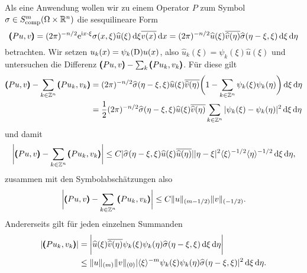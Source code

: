 Als eine Anwendung wollen wir zu einem Operator $P$ zum Symbol $\sigma\in S^m_{\rm comp} (\Omega\times\mathbb R^n)$ die sesquilineare Form
\begin{equation}
   \pmb(Pu,v\pmb) = (2\pi)^{-n/2} \relax \mathrm e^{\mathrm i x\cdot\xi} \sigma(x,\xi) \widehat u(\xi) \,\mathrm d\xi \overline{v(x)}\,\mathrm d x 
   = (2\pi)^{-n/2} \relax \widehat u(\xi) \overline{\widehat v(\eta)} \widehat\sigma(\eta-\xi,\xi) \,\mathrm d\xi\,\mathrm d\eta
\end{equation} 
betrachten. Wir setzen $u_k(x) = \psi_k(\mathrm D) u(x)$, also $\widehat u_k(\xi) = \psi_k(\xi) \widehat u(\xi)$ und untersuchen die Differenz 
$\pmb(Pu,v\pmb)-\sum_k \pmb(Pu_k,v_k\pmb)$. Für diese gilt
\begin{align}
       \pmb(Pu,v\pmb) -\sum_{k\in\mathbb Z^n} \pmb(Pu_k,v_k\pmb)  &= (2\pi)^{-n/2}  \relax \widehat\sigma (\eta-\xi,\xi) \widehat u(\xi) \overline{\widehat v(\eta)} \bigg( 1 - \sum_{k\in\mathbb Z^n} \psi_k(\xi)\psi_k(\eta)\bigg) \,\mathrm d\xi\,\mathrm d\eta  \notag\\
       &= \frac12 (2\pi)^{-n/2} \relax \widehat\sigma (\eta-\xi,\xi) \widehat u(\xi) \overline{\widehat v(\eta)}  \sum_{k\in\mathbb Z^n} | \psi_k(\xi)-\psi_k(\eta)|^2 \,\mathrm d\xi\,\mathrm d\eta 
\end{align}
und damit
\begin{equation}
   \bigg|\pmb(Pu,v\pmb) - \sum_{k\in\mathbb Z^n}\pmb(Pu_k,v_k\pmb)\bigg| \le C \relax | \widehat \sigma(\eta-\xi,\xi) \widehat u(\xi) \overline{\widehat u(\eta)}| |\eta-\xi|^2 \langle\xi\rangle^{-1/2} \langle\eta\rangle^{-1/2} \,\mathrm d\xi\,\mathrm d\eta, 
\end{equation}
zusammen mit den Symbolabschätzungen also
\begin{equation}
    \bigg|\pmb(Pu,v\pmb) - \sum_{k\in\mathbb Z^n}\pmb(Pu_k,v_k\pmb)\bigg| \le C \|u\|_{(m-1/2)} \|v\|_{(-1/2)}.
\end{equation}
 Andererseits gilt für jeden einzelnen Summanden
 \begin{align}
     |\pmb(Pu_k,v_k\pmb) | &= \bigg|\relax \widehat u(\xi) \overline{\widehat v(\eta)} \psi_k(\xi)\psi_k(\eta) \widehat\sigma(\eta-\xi,\xi) \,\mathrm d\xi\,\mathrm d\eta\bigg|
     \notag\\
     &\le \|u\|_{(m)}  \|v\|_{(0)} \relax | \langle\xi\rangle^{-m}\psi_k(\xi)\psi_k(\eta) \widehat\sigma(\eta-\xi,\xi)|^2 \,\mathrm d\xi\,\mathrm d\eta.
 \end{align}





